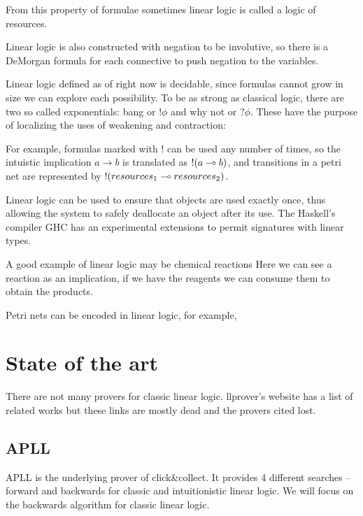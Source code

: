 \documentclass[a4paper, 12pt, tesi, english]{report}
\begin{document}
From this property of formulae sometimes linear logic is called a logic of resources.

Linear logic is also constructed with negation to be involutive, so there is a DeMorgan formula for each connective to push negation to the variables.

Linear logic defined as of right now is decidable, since formulas cannot grow in size we can explore each possibility.
To be as strong as classical logic, there are two so called exponentials: bang or $!\phi$ and why not or $?\phi$.
These have the purpose of localizing the uses of weakening and contraction:

For example, formulas marked with $!$ can be used any number of times, so the intuistic implication $a \rightarrow b$ is translated as $!(a \multimap b)$, and transitions in a petri net are represented by $!(resources_1 \multimap resources_2)$.

Linear logic can be used to ensure that objects are used exactly once, thus allowing the system to safely deallocate an object after its use.
The Haskell's compiler GHC has an experimental extensions to permit signatures with linear types.

A good example of linear logic may be chemical reactions %
Here we can see a reaction as an implication, if we have the reagents we can consume them to obtain the products.

Petri nets can be encoded in linear logic, for example, 

\section{State of the art}
There are not many provers for classic linear logic.
llprover's website has a list of related works but these links are mostly dead and the provers cited lost.

\subsection{APLL}
APLL is the underlying prover of click\&collect. %
It provides 4 different searches -- forward and backwards for classic and intuitionistic linear logic. 
We will focus on the backwards algorithm for classic linear logic.
\end{document}

